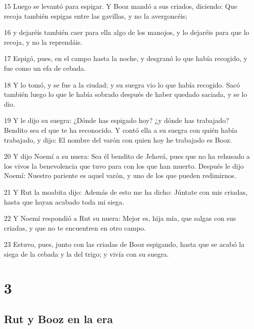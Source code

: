 \par 15 Luego se levantó para espigar. Y Booz mandó a sus criados, diciendo: Que recoja también espigas entre las gavillas, y no la avergoncéis;
\par 16 y dejaréis también caer para ella algo de los manojos, y lo dejaréis para que lo recoja, y no la reprendáis.
\par 17 Espigó, pues, en el campo hasta la noche, y desgranó lo que había recogido, y fue como un efa   de cebada.
\par 18 Y lo tomó, y se fue a la ciudad; y su suegra vio lo que había recogido. Sacó también luego lo que le había sobrado después de haber quedado saciada, y se lo dio.
\par 19 Y le dijo su suegra: ¿Dónde has espigado hoy? ¿y dónde has trabajado? Bendito sea el que te ha reconocido. Y contó ella a su suegra con quién había trabajado, y dijo: El nombre del varón con quien hoy he trabajado es Booz.
\par 20 Y dijo Noemí a su nuera: Sea él bendito de Jehová, pues que no ha rehusado a los vivos la benevolencia que tuvo para con los que han muerto. Después le dijo Noemí: Nuestro pariente es aquel varón, y uno de los que pueden redimirnos.
\par 21 Y Rut la moabita dijo: Además de esto me ha dicho: Júntate con mis criadas, hasta que hayan acabado toda mi siega.
\par 22 Y Noemí respondió a Rut su nuera: Mejor es, hija mía, que salgas con sus criadas, y que no te encuentren en otro campo.
\par 23 Estuvo, pues, junto con las criadas de Booz espigando, hasta que se acabó la siega de la cebada y la del trigo; y vivía con su suegra.

\chapter{3}

\section*{Rut y Booz en la era}

